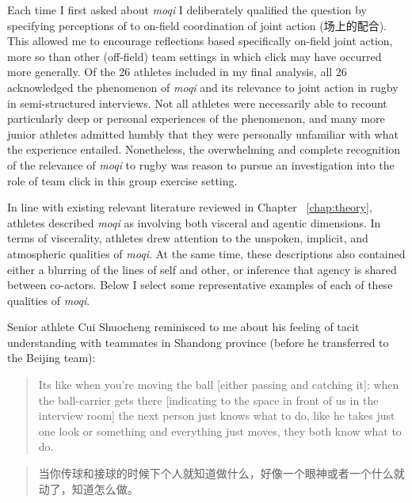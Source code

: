 \begin{CJK}{UTF8}{gbsn}
Each time I first asked about \textit{moqi} I deliberately qualified the question by specifying perceptions of to on-field coordination of joint action (场上的配合).  This allowed me to encourage reflections based specifically on-field joint action, more so than other (off-field) team settings in which click may have occurred more generally.  Of the 26 athletes included in my final analysis, all 26 acknowledged the phenomenon of \textit{moqi} and its relevance to joint action in rugby in semi-structured interviews.  Not all athletes were necessarily able to recount particularly deep or personal experiences of the phenomenon, and many more junior athletes admitted humbly that they were personally unfamiliar with what the experience entailed.  Nonetheless, the overwhelming and complete recognition of the relevance of \textit{moqi} to rugby was reason to pursue an investigation into the role of team click in this group exercise setting.

In line with existing relevant literature reviewed in Chapter ~\ref{chap:theory}, athletes described \textit{moqi} as involving both visceral and agentic dimensions.  In terms of viscerality, athletes drew attention to the unspoken, implicit, and atmospheric qualities of \textit{moqi}.  At the same time, these descriptions also contained either a blurring of the lines of self and other, or inference that agency is shared between co-actors.  Below I select some representative examples of each of these qualities of \textit{moqi}.

Senior athlete Cui Shuocheng reminisced to me about his feeling of tacit understanding with teammates in Shandong province (before he transferred to the Beijing team):

\begin{quote}
       Its like when you're moving the ball [either passing and catching it]: when the ball-carrier gets there [indicating to the space in front of us in the interview room] the next person just knows what to do, like he takes just one look or something and everything just moves, they both know what to do.
\end{quote}

\begin{quote}
         当你传球和接球的时候下个人就知道做什么，好像一个眼神或者一个什么就动了，知道怎么做。
\end{quote}


\end{CJK}
